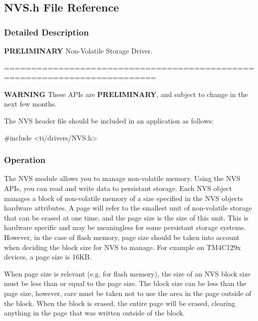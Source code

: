 \subsection{N\+V\+S.\+h File Reference}
\label{_n_v_s_8h}


\subsubsection{Detailed Description}
{\bfseries P\+R\+E\+L\+I\+M\+I\+N\+A\+R\+Y} Non-\/\+Volatile Storage Driver. 

==========================================================================

{\bfseries W\+A\+R\+N\+I\+N\+G} These A\+P\+Is are {\bfseries P\+R\+E\+L\+I\+M\+I\+N\+A\+R\+Y}, and subject to change in the next few months.

The N\+V\+S header file should be included in an application as follows\+: 
\begin{DoxyCode}
\textcolor{preprocessor}{#include <ti/drivers/NVS.h>}
\end{DoxyCode}


\subsubsection*{Operation}

The N\+V\+S module allows you to manage non-\/volatile memory. Using the N\+V\+S A\+P\+Is, you can read and write data to persistant storage. Each N\+V\+S object manages a \textquotesingle{}block\textquotesingle{} of non-\/volatile memory of a size specified in the N\+V\+S object\textquotesingle{}s hardware attributes. A \textquotesingle{}page\textquotesingle{} will refer to the smallest unit of non-\/volatile storage that can be erased at one time, and the page size is the size of this unit. This is hardware specific and may be meaningless for some persistant storage systems. However, in the case of flash memory, page size should be taken into account when deciding the block size for N\+V\+S to manage. For example on T\+M4\+C129x devices, a page size is 16\+K\+B.

When page size is relevant (e.\+g. for flash memory), the size of an N\+V\+S block size must be less than or equal to the page size. The block size can be less than the page size, however, care must be taken not to use the area in the page outside of the block. When the block is erased, the entire page will be erased, clearing anything in the page that was written outside of the block.

